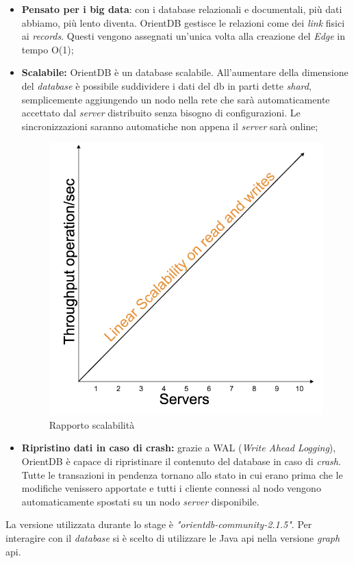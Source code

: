 \begin{itemize}
\item \textbf{Pensato per i big data}: con i database relazionali e documentali, più dati abbiamo, più lento diventa. OrientDB gestisce le relazioni come dei \textit{link} fisici ai \textit{records}. Questi vengono assegnati un'unica volta alla creazione del \textit{Edge} in tempo O(1);
\item \textbf{Scalabile:} OrientDB è un database scalabile. All'aumentare della dimensione del \textit{database} è possibile suddividere i dati del db in parti dette \textit{shard}, semplicemente aggiungendo un nodo nella rete che sarà automaticamente accettato dal \textit{server} distribuito senza bisogno di configurazioni. Le sincronizzazioni saranno automatiche non appena il \textit{server} sarà online;
\begin{figure}[h]
\centering
\includegraphics[width=0.7\linewidth]{immagini/rapporto-scalabilita}
\caption[Rapporto scalabilità]{Rapporto scalabilità}
\label{fig:rapporto-scalabilità}
\end{figure}


\item \textbf{Ripristino dati in caso di crash:} grazie a WAL (\textit{Write Ahead Logging}), OrientDB è capace di ripristinare il contenuto del database in caso di \textit{crash}. Tutte le transazioni in pendenza tornano allo stato in cui erano prima che le modifiche venissero apportate e tutti i cliente connessi al nodo vengono automaticamente spostati su un nodo \textit{server} disponibile.
\end{itemize}
La versione utilizzata durante lo stage è \textit{"orientdb-community-2.1.5"}. Per interagire con il \textit{database} si è scelto di utilizzare le Java \gls{api} nella versione \textit{graph} \gls{api}.

